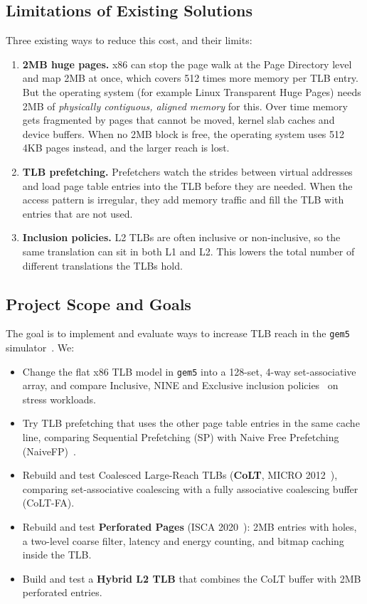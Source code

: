 \subsection{Limitations of Existing Solutions}
Three existing ways to reduce this cost, and their limits:
\begin{enumerate}
    \item \textbf{2MB huge pages.} x86 can stop the page walk at the Page Directory level and map 2MB at once, which covers 512 times more memory per TLB entry. But the operating system (for example Linux Transparent Huge Pages) needs 2MB of \textit{physically contiguous, aligned memory} for this. Over time memory gets fragmented by pages that cannot be moved, kernel slab caches and device buffers. When no 2MB block is free, the operating system uses 512 4KB pages instead, and the larger reach is lost.
    \item \textbf{TLB prefetching.} Prefetchers watch the strides between virtual addresses and load page table entries into the TLB before they are needed. When the access pattern is irregular, they add memory traffic and fill the TLB with entries that are not used.
    \item \textbf{Inclusion policies.} L2 TLBs are often inclusive or non-inclusive, so the same translation can sit in both L1 and L2. This lowers the total number of different translations the TLBs hold.
\end{enumerate}

\subsection{Project Scope and Goals}
The goal is to implement and evaluate ways to increase TLB reach in the \texttt{gem5} simulator~\cite{binkert2011gem5}. We:
\begin{itemize}
    \item Change the flat x86 TLB model in \texttt{gem5} into a 128-set, 4-way set-associative array, and compare Inclusive, NINE and Exclusive inclusion policies~\cite{baer1988multi} on stress workloads.
    \item Try TLB prefetching that uses the other page table entries in the same cache line, comparing Sequential Prefetching (SP) with Naive Free Prefetching (NaiveFP)~\cite{margaritov2019prefetched}.
    \item Rebuild and test Coalesced Large-Reach TLBs (\textbf{CoLT}, MICRO 2012~\cite{pham2012colt}), comparing set-associative coalescing with a fully associative coalescing buffer (CoLT-FA).
    \item Rebuild and test \textbf{Perforated Pages} (ISCA 2020~\cite{kwon2020perforated}): 2MB entries with holes, a two-level coarse filter, latency and energy counting, and bitmap caching inside the TLB.
    \item Build and test a \textbf{Hybrid L2 TLB} that combines the CoLT buffer with 2MB perforated entries.
\end{itemize}

